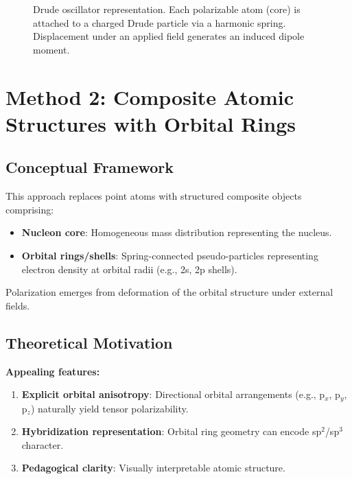 \documentclass[11pt,letterpaper]{article}
\begin{document}
\begin{figure}[h]
\centering
{}
\caption{Drude oscillator representation. Each polarizable atom (core) is attached to a charged Drude particle via a harmonic spring. Displacement under an applied field generates an induced dipole moment.}
\label{fig:drude}
\end{figure}

\section{Method 2: Composite Atomic Structures with Orbital Rings}
\label{sec:composite}

\subsection{Conceptual Framework}

This approach replaces point atoms with structured composite objects comprising:
\begin{itemize}
    \item \textbf{Nucleon core}: Homogeneous mass distribution representing the nucleus.
    \item \textbf{Orbital rings/shells}: Spring-connected pseudo-particles representing electron density at orbital radii (e.g., 2s, 2p shells).
\end{itemize}

Polarization emerges from deformation of the orbital structure under external fields.

\subsection{Theoretical Motivation}

\textbf{Appealing features:}
\begin{enumerate}
    \item \textbf{Explicit orbital anisotropy}: Directional orbital arrangements (e.g., p$_x$, p$_y$, p$_z$) naturally yield tensor polarizability.
    \item \textbf{Hybridization representation}: Orbital ring geometry can encode sp$^2$/sp$^3$ character.
    \item \textbf{Pedagogical clarity}: Visually interpretable atomic structure.
\end{enumerate}
\end{document}
